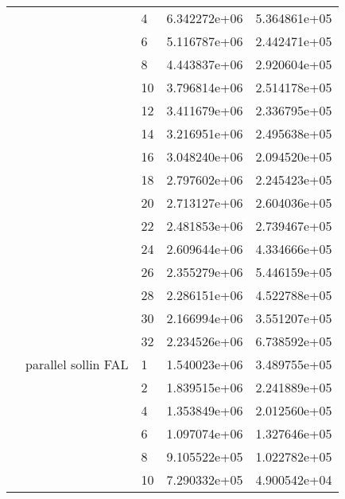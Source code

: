 \begin{tabular}{lllrr}
                      &                     & 4  &  6.342272e+06 &  5.364861e+05 \\
                      &                     & 6  &  5.116787e+06 &  2.442471e+05 \\
                      &                     & 8  &  4.443837e+06 &  2.920604e+05 \\
                      &                     & 10 &  3.796814e+06 &  2.514178e+05 \\
                      &                     & 12 &  3.411679e+06 &  2.336795e+05 \\
                      &                     & 14 &  3.216951e+06 &  2.495638e+05 \\
                      &                     & 16 &  3.048240e+06 &  2.094520e+05 \\
                      &                     & 18 &  2.797602e+06 &  2.245423e+05 \\
                      &                     & 20 &  2.713127e+06 &  2.604036e+05 \\
                      &                     & 22 &  2.481853e+06 &  2.739467e+05 \\
                      &                     & 24 &  2.609644e+06 &  4.334666e+05 \\
                      &                     & 26 &  2.355279e+06 &  5.446159e+05 \\
                      &                     & 28 &  2.286151e+06 &  4.522788e+05 \\
                      &                     & 30 &  2.166994e+06 &  3.551207e+05 \\
                      &                     & 32 &  2.234526e+06 &  6.738592e+05 \\
                      & parallel sollin FAL & 1  &  1.540023e+06 &  3.489755e+05 \\
                      &                     & 2  &  1.839515e+06 &  2.241889e+05 \\
                      &                     & 4  &  1.353849e+06 &  2.012560e+05 \\
                      &                     & 6  &  1.097074e+06 &  1.327646e+05 \\
                      &                     & 8  &  9.105522e+05 &  1.022782e+05 \\
                      &                     & 10 &  7.290332e+05 &  4.900542e+04 \\

\end{tabular}
